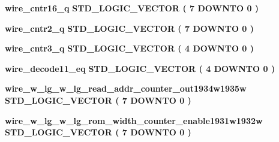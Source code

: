 \begin{DoxyCompactItemize}
\item 
{\bf wire\+\_\+cntr16\+\_\+q} {\bfseries \textcolor{comment}{S\+T\+D\+\_\+\+L\+O\+G\+I\+C\+\_\+\+V\+E\+C\+T\+OR}\textcolor{vhdlchar}{ }\textcolor{vhdlchar}{(}\textcolor{vhdlchar}{ }\textcolor{vhdlchar}{ } \textcolor{vhdldigit}{7} \textcolor{vhdlchar}{ }\textcolor{keywordflow}{D\+O\+W\+N\+TO}\textcolor{vhdlchar}{ }\textcolor{vhdlchar}{ } \textcolor{vhdldigit}{0} \textcolor{vhdlchar}{ }\textcolor{vhdlchar}{)}\textcolor{vhdlchar}{ }} 
\item 
{\bf wire\+\_\+cntr2\+\_\+q} {\bfseries \textcolor{comment}{S\+T\+D\+\_\+\+L\+O\+G\+I\+C\+\_\+\+V\+E\+C\+T\+OR}\textcolor{vhdlchar}{ }\textcolor{vhdlchar}{(}\textcolor{vhdlchar}{ }\textcolor{vhdlchar}{ } \textcolor{vhdldigit}{7} \textcolor{vhdlchar}{ }\textcolor{keywordflow}{D\+O\+W\+N\+TO}\textcolor{vhdlchar}{ }\textcolor{vhdlchar}{ } \textcolor{vhdldigit}{0} \textcolor{vhdlchar}{ }\textcolor{vhdlchar}{)}\textcolor{vhdlchar}{ }} 
\item 
{\bf wire\+\_\+cntr3\+\_\+q} {\bfseries \textcolor{comment}{S\+T\+D\+\_\+\+L\+O\+G\+I\+C\+\_\+\+V\+E\+C\+T\+OR}\textcolor{vhdlchar}{ }\textcolor{vhdlchar}{(}\textcolor{vhdlchar}{ }\textcolor{vhdlchar}{ } \textcolor{vhdldigit}{4} \textcolor{vhdlchar}{ }\textcolor{keywordflow}{D\+O\+W\+N\+TO}\textcolor{vhdlchar}{ }\textcolor{vhdlchar}{ } \textcolor{vhdldigit}{0} \textcolor{vhdlchar}{ }\textcolor{vhdlchar}{)}\textcolor{vhdlchar}{ }} 
\item 
{\bf wire\+\_\+decode11\+\_\+eq} {\bfseries \textcolor{comment}{S\+T\+D\+\_\+\+L\+O\+G\+I\+C\+\_\+\+V\+E\+C\+T\+OR}\textcolor{vhdlchar}{ }\textcolor{vhdlchar}{(}\textcolor{vhdlchar}{ }\textcolor{vhdlchar}{ } \textcolor{vhdldigit}{4} \textcolor{vhdlchar}{ }\textcolor{keywordflow}{D\+O\+W\+N\+TO}\textcolor{vhdlchar}{ }\textcolor{vhdlchar}{ } \textcolor{vhdldigit}{0} \textcolor{vhdlchar}{ }\textcolor{vhdlchar}{)}\textcolor{vhdlchar}{ }} 
\item 
{\bf wire\+\_\+w\+\_\+lg\+\_\+w\+\_\+lg\+\_\+read\+\_\+addr\+\_\+counter\+\_\+out1934w1935w} {\bfseries \textcolor{comment}{S\+T\+D\+\_\+\+L\+O\+G\+I\+C\+\_\+\+V\+E\+C\+T\+OR}\textcolor{vhdlchar}{ }\textcolor{vhdlchar}{(}\textcolor{vhdlchar}{ }\textcolor{vhdlchar}{ } \textcolor{vhdldigit}{7} \textcolor{vhdlchar}{ }\textcolor{keywordflow}{D\+O\+W\+N\+TO}\textcolor{vhdlchar}{ }\textcolor{vhdlchar}{ } \textcolor{vhdldigit}{0} \textcolor{vhdlchar}{ }\textcolor{vhdlchar}{)}\textcolor{vhdlchar}{ }} 
\item 
{\bf wire\+\_\+w\+\_\+lg\+\_\+w\+\_\+lg\+\_\+rom\+\_\+width\+\_\+counter\+\_\+enable1931w1932w} {\bfseries \textcolor{comment}{S\+T\+D\+\_\+\+L\+O\+G\+I\+C\+\_\+\+V\+E\+C\+T\+OR}\textcolor{vhdlchar}{ }\textcolor{vhdlchar}{(}\textcolor{vhdlchar}{ }\textcolor{vhdlchar}{ } \textcolor{vhdldigit}{7} \textcolor{vhdlchar}{ }\textcolor{keywordflow}{D\+O\+W\+N\+TO}\textcolor{vhdlchar}{ }\textcolor{vhdlchar}{ } \textcolor{vhdldigit}{0} \textcolor{vhdlchar}{ }\textcolor{vhdlchar}{)}\textcolor{vhdlchar}{ }} 

\end{DoxyCompactItemize}

